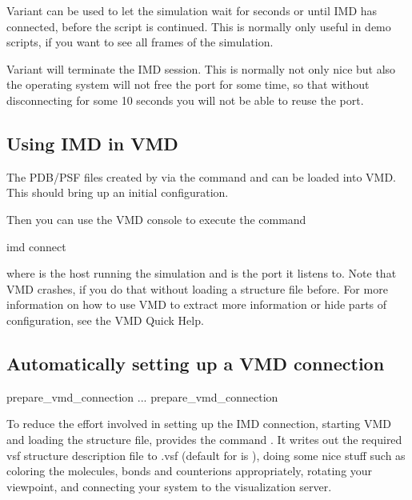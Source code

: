 Variant  can be used to let the simulation wait for
 seconds or until IMD has connected, before the script is
continued. This is normally only useful in demo scripts, if you want
to see all frames of the simulation.

Variant  will terminate the IMD session. This is normally
not only nice but also the operating system will not free the port for
some time, so that without disconnecting for some 10 seconds you will
not be able to reuse the port.

\subsection{Using IMD in VMD}

The PDB/PSF files created by \es via the command  and
 can be loaded into VMD. This should bring up an initial
configuration.

Then you can use the VMD console to execute the command
\begin{tclcode}
  imd connect  
\end{tclcode}
where  is the host running the simulation and  is
the port it listens to. Note that VMD crashes, if you do that without
loading a structure file before.  For more information on how to use
VMD to extract more information or hide parts of configuration, see
the VMD Quick Help.

\subsection{Automatically setting up a VMD connection}

\begin{essyntax}
 prepare_vmd_connection 
   
...
 prepare_vmd_connection 
\end{essyntax}

To reduce the effort involved in setting up the IMD connection,
starting VMD and loading the structure file, \es provides the command
.  It writes out the required
vsf structure description file to .vsf (default
for  is ), doing some nice stuff such as
coloring the molecules, bonds and counterions appropriately, rotating
your viewpoint, and connecting your system to the visualization
server.

